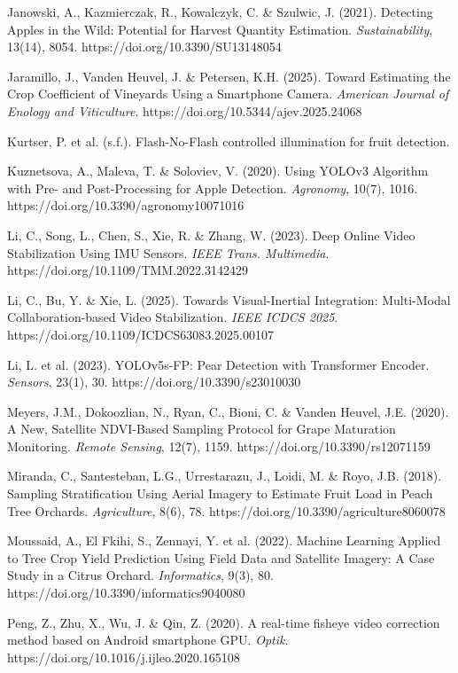 Janowski, A., Kazmierczak, R., Kowalczyk, C. \& Szulwic, J. (2021). Detecting Apples in the Wild: Potential for Harvest Quantity Estimation. \textit{Sustainability}, 13(14), 8054. https://doi.org/10.3390/SU13148054


Jaramillo, J., Vanden Heuvel, J. \& Petersen, K.H. (2025). Toward Estimating the Crop Coefficient of Vineyards Using a Smartphone Camera. \textit{American Journal of Enology and Viticulture}. https://doi.org/10.5344/ajev.2025.24068


Kurtser, P. et al. (s.f.). Flash-No-Flash controlled illumination for fruit detection.


Kuznetsova, A., Maleva, T. \& Soloviev, V. (2020). Using YOLOv3 Algorithm with Pre- and Post-Processing for Apple Detection. \textit{Agronomy}, 10(7), 1016. https://doi.org/10.3390/agronomy10071016


Li, C., Song, L., Chen, S., Xie, R. \& Zhang, W. (2023). Deep Online Video Stabilization Using IMU Sensors. \textit{IEEE Trans. Multimedia}. https://doi.org/10.1109/TMM.2022.3142429


Li, C., Bu, Y. \& Xie, L. (2025). Towards Visual-Inertial Integration: Multi-Modal Collaboration-based Video Stabilization. \textit{IEEE ICDCS 2025}. https://doi.org/10.1109/ICDCS63083.2025.00107


Li, L. et al. (2023). YOLOv5s-FP: Pear Detection with Transformer Encoder. \textit{Sensors}, 23(1), 30. https://doi.org/10.3390/s23010030


Meyers, J.M., Dokoozlian, N., Ryan, C., Bioni, C. \& Vanden Heuvel, J.E. (2020). A New, Satellite NDVI-Based Sampling Protocol for Grape Maturation Monitoring. \textit{Remote Sensing}, 12(7), 1159. https://doi.org/10.3390/rs12071159


Miranda, C., Santesteban, L.G., Urrestarazu, J., Loidi, M. \& Royo, J.B. (2018). Sampling Stratification Using Aerial Imagery to Estimate Fruit Load in Peach Tree Orchards. \textit{Agriculture}, 8(6), 78. https://doi.org/10.3390/agriculture8060078


Moussaid, A., El Fkihi, S., Zennayi, Y. et al. (2022). Machine Learning Applied to Tree Crop Yield Prediction Using Field Data and Satellite Imagery: A Case Study in a Citrus Orchard. \textit{Informatics}, 9(3), 80. https://doi.org/10.3390/informatics9040080


Peng, Z., Zhu, X., Wu, J. \& Qin, Z. (2020). A real-time fisheye video correction method based on Android smartphone GPU. \textit{Optik}. https://doi.org/10.1016/j.ijleo.2020.165108


